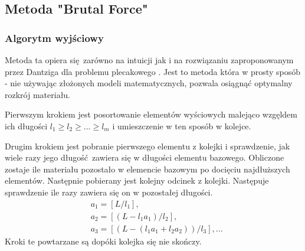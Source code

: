 \subsection{Metoda "Brutal Force"}\label{brutalForce}
\subsubsection{Algorytm wyjściowy}
Metoda ta opiera się zarówno na intuicji jak i na rozwiązaniu zaproponowanym przez Dantziga dla problemu plecakowego \cite{DantzigArticle}. Jest to metoda która w prosty sposób - nie używając złożonych modeli matematycznych, pozwala osiągnąć optymalny rozkrój materiału.

Pierwszym krokiem jest posortowanie elementów wyściowych malejąco wzgęldem ich długości $l_1 \ge l_2 \ge ... \ge l_m$ i umieszczenie w ten sposób w kolejce.

Drugim krokiem jest pobranie pierwszego elementu z kolejki i sprawdzenie, jak wiele razy jego długość zawiera się w długości elementu bazowego. Obliczone zostaje ile materiału pozostało w elemencie bazowym po docięciu najdłuższych elementów. Następnie pobierany jest kolejny odcinek z kolejki. Następuje sprawdzenie ile razy zawiera się on w pozostałej długości.
\begin{equation}\label{base_dantizg}
\begin{split}
& a_1 = [L/l_1],\\
& a_2 = [(L-l_1 a_1)/l_2],\\
& a_3 = [(L-(l_1 a_1+l_2 a_2))/l_3], ...
\end{split}
\end{equation}
Kroki te powtarzane są dopóki kolejka się nie skończy.

